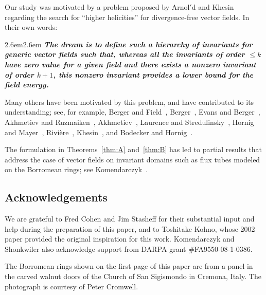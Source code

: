 \documentclass[11pt]{amsart}
\theoremstyle{definition}
\newcommand{\itb}{\bfseries\itshape}
\begin{document}
Our study was motivated by a problem proposed by Arnol$'$d and Khesin~\cite{ArnoldKhesin98} regarding the search for ``higher helicities'' for divergence-free vector fields.  In their own words:
\vspace{.05in}
\begin{indentation}{2.6em}{2.6em}
\small\itb
\noindent The dream is to define such a hierarchy of invariants for generic vector fields such that, whereas all the invariants of order $\leq k$ have zero value for a given field and there exists a nonzero invariant of order $k+1$, this nonzero invariant provides a lower bound for the field energy.
\end{indentation}
\vspace{.05in}

Many others have been motivated by this problem, and have contributed to its understanding; see, for example, Berger and Field~\cite{Berger84}, Berger~\cite{Berger90, Berger91}, Evans and Berger~\cite{EvansBerger92}, Akhmetiev and Ruzmaiken~\cite{Akhmetiev94, Akhmetiev95}, Akhmetiev~\cite{Akhmetiev98}, Laurence and Stredulinsky~\cite{Laurence}, Hornig and Mayer~\cite{Hornig}, Rivi\`ere~\cite{Riviere}, Khesin~\cite{Khesin}, and Bodecker and Hornig~\cite{Bodecker04}.


The formulation in Theorems~\ref{thm:A} and~\ref{thm:B} has led to partial results that address the case of vector fields on invariant domains such as flux tubes modeled on the Borromean rings; see Komendarczyk~\cite{Komendarczyk}.

\vspace{.2in}

\subsection*{Acknowledgements} We are grateful to Fred Cohen and Jim Stasheff for their substantial input and help during the preparation of this paper, and to Toshitake Kohno, whose 2002 paper provided the original inspiration for this work.  Komendarczyk and Shonkwiler also acknowledge support from DARPA grant \#FA9550-08-1-0386.

The Borromean rings shown on the first page of this paper are from a panel in the carved walnut doors of the Church of San Sigismondo in Cremona, Italy.  The photograph is courtesy of Peter Cromwell.

\clearpage

\end{document}
